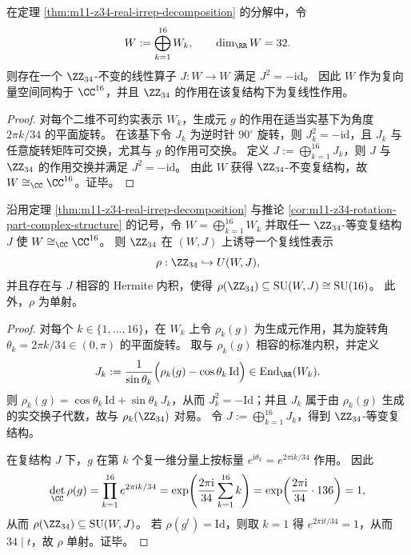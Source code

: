 \begin{corollary}\label{cor:m11-z34-rotation-part-complex-structure}
在定理 \ref{thm:m11-z34-real-irrep-decomposition} 的分解中，令
\[
W:=\bigoplus_{k=1}^{16}W_k,
\qquad \dim_{\RR}W=32.
\]
则存在一个 \(\ZZ_{34}\)-不变的线性算子 \(J:W\to W\) 满足 \(J^2=-\mathrm{id}\)。
因此 \(W\) 作为复向量空间同构于 \(\CC^{16}\)，并且 \(\ZZ_{34}\) 的作用在该复结构下为复线性作用。
\end{corollary}
\begin{proof}
对每个二维不可约实表示 \(W_k\)，生成元 \(g\) 的作用在适当实基下为角度 \(2\pi k/34\) 的平面旋转。
在该基下令 \(J_k\) 为逆时针 \(90^\circ\) 旋转，则 \(J_k^2=-\mathrm{id}\)，且 \(J_k\) 与任意旋转矩阵可交换，尤其与 \(g\) 的作用可交换。
定义 \(J:=\bigoplus_{k=1}^{16}J_k\)，则 \(J\) 与 \(\ZZ_{34}\) 的作用交换并满足 \(J^2=-\mathrm{id}\)。
由此 \(W\) 获得 \(\ZZ_{34}\)-不变复结构，故 \(W\cong_{\CC}\CC^{16}\)。证毕。
\end{proof}

\begin{theorem}\label{thm:m11-z34-uplift-intrinsic-su16}
沿用定理 \ref{thm:m11-z34-real-irrep-decomposition} 与推论 \ref{cor:m11-z34-rotation-part-complex-structure} 的记号，令
\(
W=\bigoplus_{k=1}^{16}W_k
\)
并取任一 \(\ZZ_{34}\)-等变复结构 \(J\) 使 \(W\cong_{\CC}\CC^{16}\)。
则 \(\ZZ_{34}\) 在 \((W,J)\) 上诱导一个复线性表示
\[
\rho:\ZZ_{34}\hookrightarrow U(W,J),
\]
并且存在与 \(J\) 相容的 Hermite 内积，使得 \(\rho(\ZZ_{34})\subseteq \mathrm{SU}(W,J)\cong \mathrm{SU}(16)\)。
此外，\(\rho\) 为单射。
\end{theorem}
\begin{proof}
对每个 \(k\in\{1,\dots,16\}\)，在 \(W_k\) 上令 \(\rho_k(g)\) 为生成元作用，其为旋转角 \(\theta_k=2\pi k/34\in(0,\pi)\) 的平面旋转。
取与 \(\rho_k(g)\) 相容的标准内积，并定义
\[
J_k:=\frac{1}{\sin\theta_k}\Bigl(\rho_k(g)-\cos\theta_k\,\mathrm{Id}\Bigr)\in \mathrm{End}_{\RR}(W_k).
\]
则 \(\rho_k(g)=\cos\theta_k\,\mathrm{Id}+\sin\theta_k\,J_k\)，从而 \(J_k^2=-\mathrm{Id}\)；并且 \(J_k\) 属于由 \(\rho_k(g)\) 生成的实交换子代数，故与 \(\rho_k(\ZZ_{34})\) 对易。
令 \(J:=\bigoplus_{k=1}^{16}J_k\)，得到 \(\ZZ_{34}\)-等变复结构。
\par
在复结构 \(J\) 下，\(g\) 在第 \(k\) 个复一维分量上按标量 \(e^{\mathrm{i}\theta_k}=e^{2\pi \mathrm{i}k/34}\) 作用。
因此
\[
\det_{\CC}\rho(g)=\prod_{k=1}^{16}e^{2\pi \mathrm{i}k/34}
=\exp\!\left(\frac{2\pi \mathrm{i}}{34}\sum_{k=1}^{16}k\right)
=\exp\!\left(\frac{2\pi \mathrm{i}}{34}\cdot 136\right)=1,
\]
从而 \(\rho(\ZZ_{34})\subseteq \mathrm{SU}(W,J)\)。
若 \(\rho(g^t)=\mathrm{Id}\)，则取 \(k=1\) 得 \(e^{2\pi \mathrm{i}t/34}=1\)，从而 \(34\mid t\)，故 \(\rho\) 单射。证毕。
\end{proof}

